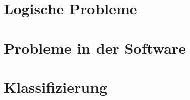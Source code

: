 \textit{\lipsum[1]}

\section{Logische Probleme}
\textit{\lipsum[1]}

\section{Probleme in der Software}
\textit{\lipsum[1]}

\section{Klassifizierung}
\textit{\lipsum[1]}